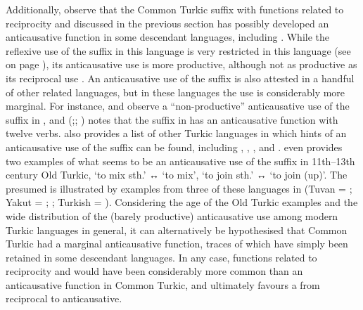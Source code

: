 Additionally, observe that the Common Turkic suffix  with functions related to reciprocity and  discussed in the previous section has possibly developed an anticausative function in some descendant languages, including . While the reflexive use of the suffix  in this language is very restricted in this language (see  on page \pageref{tab:ch7:recp-refl-tuvan}), its anticausative use is more productive, although not as productive as its reciprocal use \citep[1176ff., 1221f.]{kuular:2007}. An anticausative use of the suffix is also attested in a handful of other related languages, but in these languages the use is considerably more marginal. For instance, \cite[295]{nedjalkov:2007d} and \cite[1142]{nedjalkov:nedjalkov:2007} observe a “non-productive” anticausative use of the suffix  in , and \citeauthor{gandon:2013} (\citeyear[16f.]{gandon:2013};; \citeyear{gandon:2018}) notes that the suffix  in  has an anticausative function with twelve verbs. \cite[57ff.]{gandon:2013} also provides a list of other Turkic languages in which hints of an anticausative use of the suffix can be found, including , , , and . \cite[58]{gandon:2013} even provides two examples of what seems to be an anticausative use of the suffix  in 11th--13th century Old Turkic,  ‘to mix sth.’ ↔  ‘to mix’,  ‘to join sth.’ ↔  ‘to join (up)’. The presumed  is illustrated by examples from three of these languages in  (Tuvan = \citealt[1177, 1222]{kuular:2007}; Yakut = \citealt[295]{nedjalkov:2007d}; \citealt[1112]{nedjalkov:nedjalkov:2007}; Turkish = \citealt[12, 17]{gandon:2013}). Considering the age of the Old Turkic examples and the wide distribution of the (barely productive) anticausative use among modern Turkic languages in general, it can alternatively be hypothesised that Common Turkic  had a marginal anticausative function, traces of which have simply been retained in some descendant languages. In any case, functions related to reciprocity and  would have been considerably more common than an anticausative function in Common Turkic, and \cite{gandon:2018} ultimately favours a  from reciprocal to anticausative.

